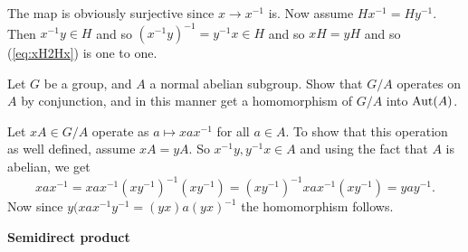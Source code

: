 \documentclass[12pt]{book}
\def\Aut{\mathop{\rm Aut}\nolimits}
\newcounter{myenumi}
\newenvironment{myenumerate}
{\begin{enumerate}
 \setcounter{enumi}{\themyenumi}
}
{\setcounter{myenumi}{\theenumi}
 \end{enumerate}}
\begin{document}
\begin{myenumerate}
The map is obviously surjective since \(x\rightarrow x^{-1}\) is.
Now assume \(Hx^{-1} = Hy^{-1}\). Then  \(x^{-1}y\in H\)
and so \((x^{-1}y)^{-1} = y^{-1}x \in H\) and so \(xH = yH\)
and so (\ref{eq:xH2Hx}) is one to one.

\begin{excopy}
Let $G$ be a group, and $A$ a normal abelian subgroup.
Show that \(G/A\) operates on $A$ by conjunction,
and in this manner get a homomorphism of \(G/A\) into \(\Aut(A)\).
\end{excopy}

Let \(xA\in G/A\) operate as \(a\mapsto xax^{-1}\) for all \(a\in A\).
To show that this operation as well defined, assume \(xA=yA\).
So \(x^{-1}y, y^{-1}x\in A\) and using the fact that $A$ is abelian, we get
\begin{equation}
xax^{-1} =
xax^{-1}(xy^{-1})^{-1}(xy^{-1}) =
(xy^{-1})^{-1}xax^{-1}(xy^{-1}) =
yay^{-1}.
\end{equation}
Now since \(y(xax^{-1}y^{-1} = (yx)a(yx)^{-1}\) the homomorphism follows.

\end{myenumerate}
\textbf{Semidirect product}
\end{document}
